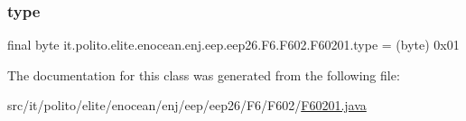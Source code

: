 \hypertarget{classit_1_1polito_1_1elite_1_1enocean_1_1enj_1_1eep_1_1eep26_1_1_f6_1_1_f602_1_1_f60201_afb9cb3e2a3a62c90ff7e75c3763512fa}{}\label{classit_1_1polito_1_1elite_1_1enocean_1_1enj_1_1eep_1_1eep26_1_1_f6_1_1_f602_1_1_f60201_afb9cb3e2a3a62c90ff7e75c3763512fa} 
\subsubsection{\texorpdfstring{type}{type}}
{\footnotesize\ttfamily final byte it.\+polito.\+elite.\+enocean.\+enj.\+eep.\+eep26.\+F6.\+F602.\+F60201.\+type = (byte) 0x01\hspace{0.3cm}{\ttfamily [static]}}



The documentation for this class was generated from the following file\+:\begin{DoxyCompactItemize}
\item 
src/it/polito/elite/enocean/enj/eep/eep26/\+F6/\+F602/\hyperlink{_f60201_8java}{F60201.\+java}\end{DoxyCompactItemize}
